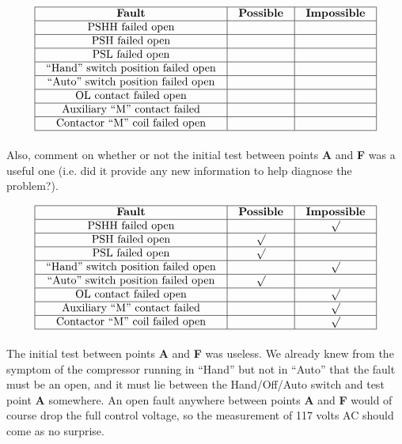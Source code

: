 $$\vbox{\offinterlineskip
\halign{\strut
\vrule \quad\hfil # \ \hfil & 
\vrule \quad\hfil # \ \hfil & 
\vrule \quad\hfil # \ \hfil \vrule \cr
\noalign{\hrule}
%
{\bf Fault} & {\bf Possible} & {\bf Impossible} \cr
%
\noalign{\hrule}
%
PSHH failed open &  &  \cr
%
\noalign{\hrule}
%
PSH failed open &  &  \cr
%
\noalign{\hrule}
%
PSL failed open &  &  \cr
%
\noalign{\hrule}
%
``Hand'' switch position failed open &  &  \cr
%
\noalign{\hrule}
%
``Auto'' switch position failed open &  &  \cr
%
\noalign{\hrule}
%
OL contact failed open &  &  \cr
%
\noalign{\hrule}
%
Auxiliary ``M'' contact failed &  &  \cr
%
\noalign{\hrule}
%
Contactor ``M'' coil failed open &  &  \cr
%
\noalign{\hrule}
} %
}$$ %

Also, comment on whether or not the initial test between points {\bf A} and {\bf F} was a useful one (i.e. did it provide any new information to help diagnose the problem?).








$$\vbox{\offinterlineskip
\halign{\strut
\vrule \quad\hfil # \ \hfil & 
\vrule \quad\hfil # \ \hfil & 
\vrule \quad\hfil # \ \hfil \vrule \cr
\noalign{\hrule}
%
{\bf Fault} & {\bf Possible} & {\bf Impossible} \cr
%
\noalign{\hrule}
%
PSHH failed open &  & $\surd$ \cr
%
\noalign{\hrule}
%
PSH failed open & $\surd$ &  \cr
%
\noalign{\hrule}
%
PSL failed open & $\surd$ &  \cr
%
\noalign{\hrule}
%
``Hand'' switch position failed open &  & $\surd$ \cr
%
\noalign{\hrule}
%
``Auto'' switch position failed open & $\surd$ &  \cr
%
\noalign{\hrule}
%
OL contact failed open &  & $\surd$ \cr
%
\noalign{\hrule}
%
Auxiliary ``M'' contact failed &  & $\surd$ \cr
%
\noalign{\hrule}
%
Contactor ``M'' coil failed open &  & $\surd$ \cr
%
\noalign{\hrule}
} %
}$$ %

The initial test between points {\bf A} and {\bf F} was useless.  We already knew from the symptom of the compressor running in ``Hand'' but not in ``Auto'' that the fault must be an open, and it must lie between the Hand/Off/Auto switch and test point {\bf A} somewhere.  An open fault anywhere between points {\bf A} and {\bf F} would of course drop the full control voltage, so the measurement of 117 volts AC should come as no surprise.

